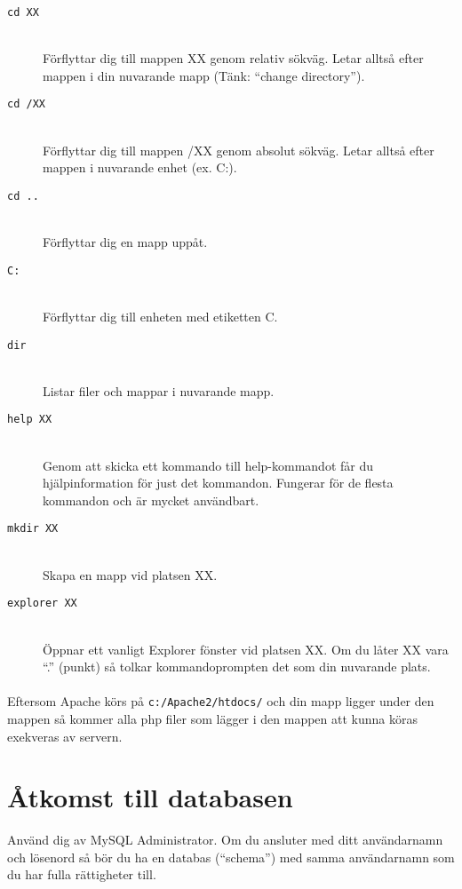 \documentclass{article}
\begin{document}
    \begin{description}
      \item[\texttt{cd XX}] \hfill \\
      Förflyttar dig till mappen XX genom relativ sökväg. Letar alltså efter mappen i din nuvarande mapp (Tänk: ``change directory'').
      
      \item[\texttt{cd /XX}] \hfill \\
      Förflyttar dig till mappen /XX genom absolut sökväg. Letar alltså efter mappen i nuvarande enhet (ex. C:).

      \item[\texttt{cd ..}] \hfill \\
      Förflyttar dig en mapp uppåt.

      \item[\texttt{C:}] \hfill \\
      Förflyttar dig till enheten med etiketten C.

      \item[\texttt{dir}] \hfill \\
      Listar filer och mappar i nuvarande mapp.

      \item[\texttt{help XX}] \hfill \\
      Genom att skicka ett kommando till help-kommandot får du hjälpinformation för just det kommandon. Fungerar för de flesta kommandon och är mycket användbart.

      \item[\texttt{mkdir XX}] \hfill \\
      Skapa en mapp vid platsen XX.

      \item[\texttt{explorer XX}] \hfill \\
      Öppnar ett vanligt Explorer fönster vid platsen XX. Om du låter XX vara ``.'' (punkt) så tolkar kommandoprompten det som din nuvarande plats.
    \end{description}

  \paragraph{}
    Eftersom Apache körs på \texttt{c:/Apache2/htdocs/} och din mapp ligger under den mappen så kommer alla php filer som lägger i den mappen att kunna köras exekveras av servern.

  \section{Åtkomst till databasen}
  Använd dig av MySQL Administrator. Om du ansluter med ditt användarnamn och lösenord så bör du ha en databas (``schema'') med samma användarnamn som du har fulla rättigheter till.
\end{document}
